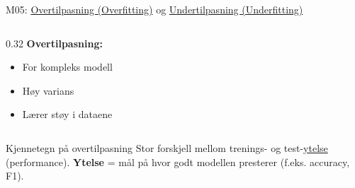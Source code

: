 \documentclass[aspectratio=169, 10pt]{beamer}
\begin{document}
\begin{frame}{M05: \href{https://en.wikipedia.org/wiki/Overfitting}{Overtilpasning (Overfitting)} og \href{https://en.wikipedia.org/wiki/Overfitting\#Underfitting}{Undertilpasning (Underfitting)}}
\begin{columns}
        \begin{column}{0.32\textwidth}
            \textbf{Overtilpasning:}
            \begin{itemize}
                \item For kompleks modell
                \item Høy varians
                \item Lærer støy i dataene
            \end{itemize}
            \begin{center}
            \end{center}
        \end{column}
    \end{columns}

    \vspace{3mm}
    \begin{block}{\footnotesize Kjennetegn på overtilpasning}
        \footnotesize Stor forskjell mellom trenings- og test-\href{https://en.wikipedia.org/wiki/Evaluation_of_machine_learning_models}{ytelse} (performance). \textbf{Ytelse} = mål på hvor godt modellen presterer (f.eks. accuracy, F1).
    \end{block}

\end{frame}
\end{document}
